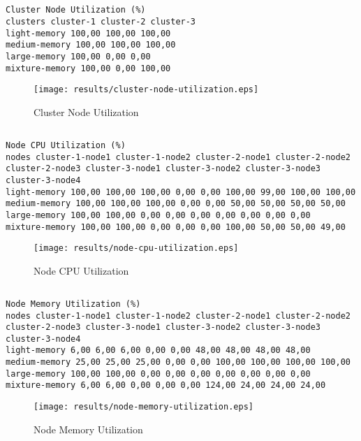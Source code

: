 \documentclass{elsart}
\begin{document}
\subsection{}

\begin{lstlisting}[caption={Cluster Node Utilization}]
Cluster Node Utilization (%)
clusters cluster-1 cluster-2 cluster-3
light-memory 100,00 100,00 100,00
medium-memory 100,00 100,00 100,00
large-memory 100,00 0,00 0,00
mixture-memory 100,00 0,00 100,00
\end{lstlisting}

\begin{figure}[ht]
\centering
\texttt{[image: results/cluster-node-utilization.eps]}
\caption{Cluster Node Utilization}\label{fig:cluster-node-utilization.eps}
\end{figure}

\subsection{}

\begin{lstlisting}[caption={Node CPU Utilization}]
Node CPU Utilization (%)
nodes cluster-1-node1 cluster-1-node2 cluster-2-node1 cluster-2-node2 cluster-2-node3 cluster-3-node1 cluster-3-node2 cluster-3-node3 cluster-3-node4
light-memory 100,00 100,00 100,00 0,00 0,00 100,00 99,00 100,00 100,00
medium-memory 100,00 100,00 100,00 0,00 0,00 50,00 50,00 50,00 50,00
large-memory 100,00 100,00 0,00 0,00 0,00 0,00 0,00 0,00 0,00
mixture-memory 100,00 100,00 0,00 0,00 0,00 100,00 50,00 50,00 49,00
\end{lstlisting}

\begin{figure}[ht]
\centering
\texttt{[image: results/node-cpu-utilization.eps]}
\caption{Node CPU Utilization}\label{fig:node-cpu-utilization.eps}
\end{figure}

\subsection{}

\begin{lstlisting}[caption={Node Memory Utilization}]
Node Memory Utilization (%)
nodes cluster-1-node1 cluster-1-node2 cluster-2-node1 cluster-2-node2 cluster-2-node3 cluster-3-node1 cluster-3-node2 cluster-3-node3 cluster-3-node4
light-memory 6,00 6,00 6,00 0,00 0,00 48,00 48,00 48,00 48,00
medium-memory 25,00 25,00 25,00 0,00 0,00 100,00 100,00 100,00 100,00
large-memory 100,00 100,00 0,00 0,00 0,00 0,00 0,00 0,00 0,00
mixture-memory 6,00 6,00 0,00 0,00 0,00 124,00 24,00 24,00 24,00
\end{lstlisting}

\begin{figure}[ht]
\centering
\texttt{[image: results/node-memory-utilization.eps]}
\caption{Node Memory Utilization}\label{fig:node-memory-utilization.eps}
\end{figure}
\end{document}
